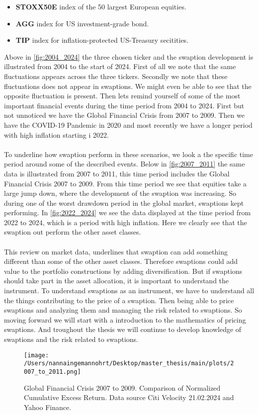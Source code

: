 \begin{itemize}
    \item \textbf{STOXX50E} \text{---}  index of the 50 largest European equities.
    \item \textbf{AGG} \text{---}  index for US investment-grade bond. 
    \item \textbf{TIP} \text{---}  index for inflation-protected US-Treasury secitities.
    \end{itemize}
\noindent
Above in \autoref{fig:2004_2024} the three chosen ticker and the swaption development
is illustrated from 2004 to the start of 2024.
First of all we note that the same fluctuations appears across the three tickers. 
Secondly we note that these fluctuations does not appear in swaptions. 
We might even be able to see that the opposite fluctuation is present. 
Then lets remind yourself of some of the most important financial events during 
the time period from 2004 to 2024. First but not unnoticed we have the Global Financial Crisis
from 2007 to 2009.  Then we have the COVID-19 Pandemic in 2020 and most recently we have a 
longer period with high inflation starting i 2022. 
\\\\
To underline how swaption perform in these scenarios, we look a the specific time period
around some of the described events. Below in \autoref{fig:2007_2011} the same data is illustrated
from 2007 to 2011, this time period includes the Global Financial Crisis 2007 to 2009. 
From this time period we see that equities take a large jump down, where the development of the 
swaption was increasing. So during one of the worst drawdown period in the global market, 
swaptions kept performing. In \autoref{fig:2022_2024} we see the data displayed at the 
time period from 2022 to 2024, which is a period with high inflation. 
Here we clearly see that the swaption out perform the other asset classes. 
\\\\
This review on market data, underlines that swaption can add something different than some 
of the other asset classes. Therefore swaptions could add value to the portfolio constructions by adding diversification. 
But if swaptions should take part in the asset allocation, it is important to understand the instrument.
To understand swaptions as an instrument, we have to understand all the things contributing to the price
of a swaption. Then being able to price swaptions and analyzing them and managing the risk related to 
swaptions.  So moving forward we will start with a introduction to the mathematics of pricing swaptions. 
And troughout the thesis we will continue to develop knowledge of swaptions and the risk related to swaptions.
\begin{figure}[H]
    \centering
    \texttt{[image: /Users/nannaingemannohrt/Desktop/master\_thesis/main/plots/2007\_to\_2011.png]}
    \caption{Global Financial Crisis 2007 to 2009.  Comparison of Normalized Cumulative Excess Return. Data source Citi Velocity 21.02.2024 
    and Yahoo Finance.}
    \label{fig:2007_2011}
\end{figure}
\noindent

